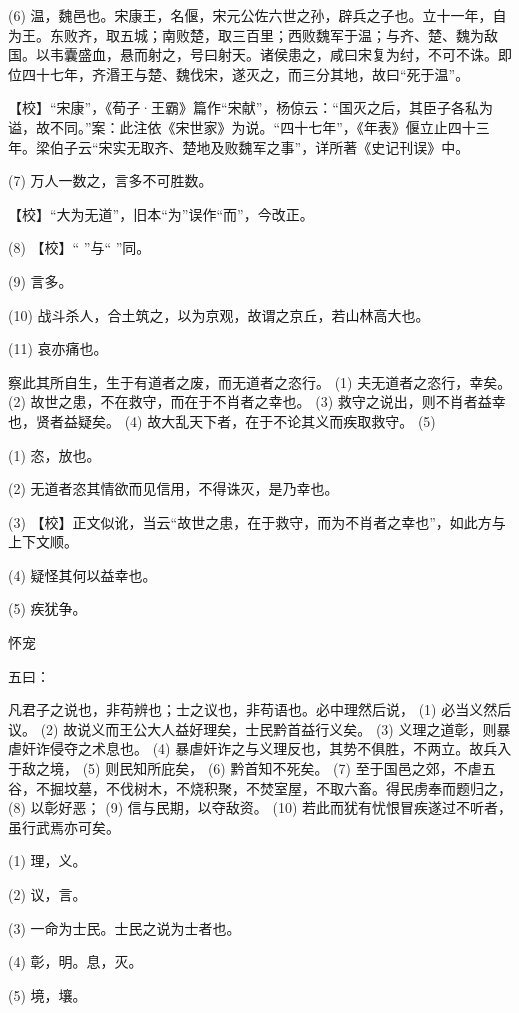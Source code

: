 \documentclass[12pt,UTF8]{ctexbook}
\begin{document}
(6) 温，魏邑也。宋康王，名偃，宋元公佐六世之孙，辟兵之子也。立十一年，自为王。东败齐，取五城；南败楚，取三百里；西败魏军于温；与齐、楚、魏为敌国。以韦囊盛血，悬而射之，号曰射天。诸侯患之，咸曰宋复为纣，不可不诛。即位四十七年，齐湣王与楚、魏伐宋，遂灭之，而三分其地，故曰“死于温”。

【校】“宋康”，《荀子·王霸》篇作“宋献”，杨倞云：“国灭之后，其臣子各私为谥，故不同。”案：此注依《宋世家》为说。“四十七年”，《年表》偃立止四十三年。梁伯子云“宋实无取齐、楚地及败魏军之事”，详所著《史记刊误》中。

(7) 万人一数之，言多不可胜数。

【校】“大为无道”，旧本“为”误作“而”，今改正。

(8) 【校】“ ”与“ ”同。

(9) 言多。

(10) 战斗杀人，合土筑之，以为京观，故谓之京丘，若山林高大也。

(11) 哀亦痛也。

察此其所自生，生于有道者之废，而无道者之恣行。 (1) 夫无道者之恣行，幸矣。 (2) 故世之患，不在救守，而在于不肖者之幸也。 (3) 救守之说出，则不肖者益幸也，贤者益疑矣。 (4) 故大乱天下者，在于不论其义而疾取救守。 (5)

(1) 恣，放也。

(2) 无道者恣其情欲而见信用，不得诛灭，是乃幸也。

(3) 【校】正文似讹，当云“故世之患，在于救守，而为不肖者之幸也”，如此方与上下文顺。

(4) 疑怪其何以益幸也。

(5) 疾犹争。





怀宠


五曰：

凡君子之说也，非苟辨也；士之议也，非苟语也。必中理然后说， (1) 必当义然后议。 (2) 故说义而王公大人益好理矣，士民黔首益行义矣。 (3) 义理之道彰，则暴虐奸诈侵夺之术息也。 (4) 暴虐奸诈之与义理反也，其势不俱胜，不两立。故兵入于敌之境， (5) 则民知所庇矣， (6) 黔首知不死矣。 (7) 至于国邑之郊，不虐五谷，不掘坟墓，不伐树木，不烧积聚，不焚室屋，不取六畜。得民虏奉而题归之， (8) 以彰好恶； (9) 信与民期，以夺敌资。 (10) 若此而犹有忧恨冒疾遂过不听者，虽行武焉亦可矣。

(1) 理，义。

(2) 议，言。

(3) 一命为士民。士民之说为士者也。

(4) 彰，明。息，灭。

(5) 境，壤。
\end{document}
